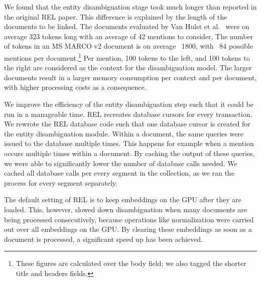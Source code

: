 
We found that the entity disambiguation stage took much longer than reported in the original REL paper. This difference is explained by the length of the documents to be linked. The documents evaluated by Van Hulst et al.~\cite{REL} were on average 323 tokens long with an average of 42 mentions to consider. The number of tokens in an MS MARCO v2 document is on average ~1800, with ~84 possible mentions per document.\footnote{These figures are calculated over the body field; we also tagged the shorter title and headers fields.}
Per mention, 100 tokens to the left, and 100 tokens to the right are considered as the context for the disambiguation model. 
The larger documents result in a larger memory consumption per context and per document, with higher processing costs as a consequence.

We improve the efficiency of the entity disambiguation step such that it could be run in a manageable time. REL recreates database cursors for every transaction. We rewrote the REL database code such that one database cursor is created for the entity disambiguation module. 
Within a document, the same queries were issued to the database multiple times. This happens for example when a mention occurs multiple times within a document. By caching the output of these queries, we were able to significantly lower the number of database calls needed. We cached all database calls per every segment in the collection, as we ran the process for every segment separately. 

The default setting of REL is to keep embeddings on the GPU after they are loaded. This, however, slowed down disambiguation when many documents are being processed consecutively, because operations like normalization were carried out over all embeddings on the GPU. By clearing these embeddings as soon as a document is processed, a significant speed up has been achieved.

